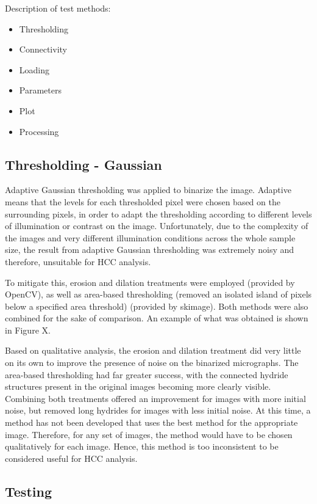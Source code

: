 \begin{enumerate}
Description of test methods:
        \begin{itemize}
            \item Thresholding
            \item Connectivity
            \item Loading
            \item Parameters
            \item Plot
            \item Processing
        \end{itemize}

\subsection{Thresholding - Gaussian}

Adaptive Gaussian thresholding was applied to binarize the image. Adaptive means that the levels for each thresholded pixel were chosen based on the surrounding pixels, in order to adapt the thresholding according to different levels of illumination or contrast on the image. Unfortunately, due to the complexity of the images and very different illumination conditions across the whole sample size, the result from adaptive Gaussian thresholding was extremely noisy and therefore, unsuitable for HCC analysis.

To mitigate this, erosion and dilation treatments were employed (provided by OpenCV), as well as area-based thresholding (removed an isolated island of pixels below a specified area threshold) (provided by skimage). Both methods were also combined for the sake of comparison. An example of what was obtained is shown in Figure X.

Based on qualitative analysis, the erosion and dilation treatment did very little on its own to improve the presence of noise on the binarized micrographs. The area-based thresholding had far greater success, with the connected hydride structures present in the original images becoming more clearly visible. Combining both treatments offered an improvement for images with more initial noise, but removed long hydrides for images with less initial noise. At this time, a method has not been developed that uses the best method for the appropriate image. Therefore, for any set of images, the method would have to be chosen qualitatively for each image. Hence, this method is too inconsistent to be considered useful for HCC analysis. 

\subsection{Testing}


\end{enumerate}
